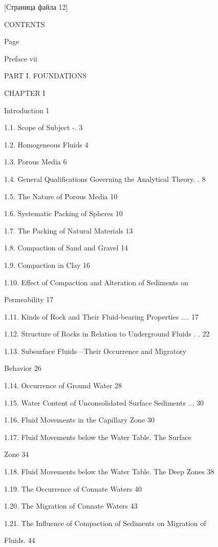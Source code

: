 \documentclass[
  11pt,
]{article}
\begin{document}
\begingroup\small\setlength{\parindent}{0pt}\setlength{\parskip}{1pt}
{[}Страница файла 12{]}\par
CONTENTS \par
Page \par
Preface vii \par
PART I. FOUNDATIONS \par
CHAPTER I \par
Introduction 1 \par
1.1. Scope of Subject -. 3 \par
1.2. Homogeneous Fluids 4 \par
1.3. Porous Media 6 \par
1.4. General Qualifications Governing the Analytical Theory. . 8 \par
1.5. The Nature of Porous Media 10 \par
1.6. Systematic Packing of Spheres 10 \par
1.7. The Packing of Natural Materials 13 \par
1.8. Compaction of Sand and Gravel 14 \par
1.9. Compaction in Clay 16 \par
1.10. Effect of Compaction and Alteration of Sediments on \par
Permeability 17 \par
1.11. Kinds of Rock and Their Fluid-bearing Properties .... 17 \par
1.12. Structure of Rocks in Relation to Underground Fluids . . 22 \par
1.13. Subsurface Fluids---Their Occurrence and Migratory \par
Behavior 26 \par
1.14. Occurrence of Ground Water 28 \par
1.15. Water Content of Unconsolidated Surface Sediments ... 30 \par
1.16. Fluid Movements in the Capillary Zone 30 \par
1.17. Fluid Movements below the Water Table. The Surface \par
Zone 34 \par
1.18. Fluid Movements below the Water Table. The Deep Zones 38 \par
1.19. The Occurrence of Connate Waters 40 \par
1.20. The Migration of Connate Waters 43 \par
1.21. The Influence of Compaction of Sediments on Migration of \par
Fluids. 44 \par
\end{document}
